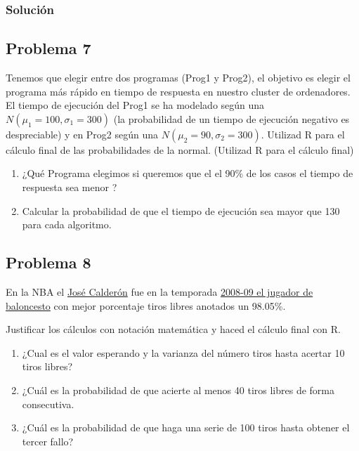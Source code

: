 \documentclass[
]{article}
\providecommand{\tightlist}{%
  \setlength{\itemsep}{0pt}\setlength{\parskip}{0pt}}
\begin{document}
\hypertarget{soluciuxf3n-5}{%
\subsubsection{Solución}\label{soluciuxf3n-5}}

\hypertarget{problema-7}{%
\subsection{Problema 7}\label{problema-7}}

Tenemos que elegir entre dos programas (Prog1 y Prog2), el objetivo es
elegir el programa más rápido en tiempo de respuesta en nuestro cluster
de ordenadores. El tiempo de ejecución del Prog1 se ha modelado según
una \(N(\mu_1=100, \sigma_1=300)\) (la probabilidad de un tiempo de
ejecución negativo es despreciable) y en Prog2 según una
\(N(\mu_2=90, \sigma_2=300)\). Utilizad R para el cálculo final de las
probabilidades de la normal. (Utilizad R para el cálculo final)

\begin{enumerate}
\def\labelenumi{\arabic{enumi}.}
\tightlist
\item
  ¿Qué Programa elegimos si queremos que el el 90\% de los casos el
  tiempo de respuesta sea menor ?
\item
  Calcular la probabilidad de que el tiempo de ejecución sea mayor que
  130 para cada algoritmo.
\end{enumerate}

\hypertarget{problema-8}{%
\subsection{Problema 8}\label{problema-8}}

En la NBA el
\href{https://es.wikipedia.org/wiki/Jos\%C3\%A9_Manuel_Calder\%C3\%B3n}{José
Calderón} fue en la temporada
\href{https://es.wikipedia.org/wiki/L\%C3\%ADderes_en_porcentaje_de_tiros_libres_de_la_NBA}{2008-09
el jugador de baloncesto} con mejor porcentaje tiros libres anotados un
98.05\%.

Justificar los cálculos con notación matemática y haced el cálculo final
con R.

\begin{enumerate}
\def\labelenumi{\arabic{enumi}.}
\tightlist
\item
  ¿Cual es el valor esperando y la varianza del número tiros hasta
  acertar 10 tiros libres?
\item
  ¿Cuál es la probabilidad de que acierte al menos 40 tiros libres de
  forma consecutiva.
\item
  ¿Cuál es la probabilidad de que haga una serie de 100 tiros hasta
  obtener el tercer fallo?
\end{enumerate}
\end{document}

